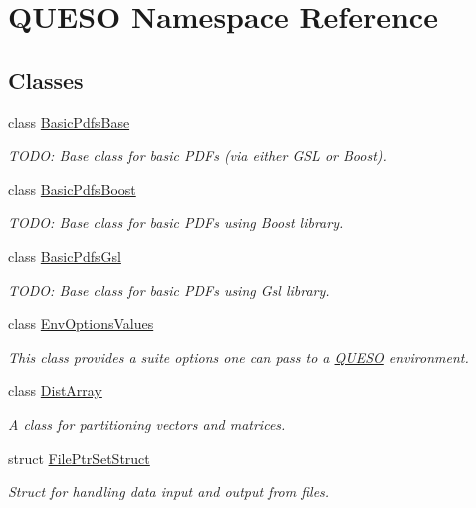\hypertarget{namespace_q_u_e_s_o}{\section{Q\-U\-E\-S\-O Namespace Reference}
\label{namespace_q_u_e_s_o}
}
\subsection*{Classes}
\begin{DoxyCompactItemize}
\item 
class \hyperlink{class_q_u_e_s_o_1_1_basic_pdfs_base}{Basic\-Pdfs\-Base}
\begin{DoxyCompactList}\small\item\em T\-O\-D\-O\-: Base class for basic P\-D\-Fs (via either G\-S\-L or Boost). \end{DoxyCompactList}\item 
class \hyperlink{class_q_u_e_s_o_1_1_basic_pdfs_boost}{Basic\-Pdfs\-Boost}
\begin{DoxyCompactList}\small\item\em T\-O\-D\-O\-: Base class for basic P\-D\-Fs using Boost library. \end{DoxyCompactList}\item 
class \hyperlink{class_q_u_e_s_o_1_1_basic_pdfs_gsl}{Basic\-Pdfs\-Gsl}
\begin{DoxyCompactList}\small\item\em T\-O\-D\-O\-: Base class for basic P\-D\-Fs using Gsl library. \end{DoxyCompactList}\item 
class \hyperlink{class_q_u_e_s_o_1_1_env_options_values}{Env\-Options\-Values}
\begin{DoxyCompactList}\small\item\em This class provides a suite options one can pass to a \hyperlink{namespace_q_u_e_s_o}{Q\-U\-E\-S\-O} environment. \end{DoxyCompactList}\item 
class \hyperlink{class_q_u_e_s_o_1_1_dist_array}{Dist\-Array}
\begin{DoxyCompactList}\small\item\em A class for partitioning vectors and matrices. \end{DoxyCompactList}\item 
struct \hyperlink{struct_q_u_e_s_o_1_1_file_ptr_set_struct}{File\-Ptr\-Set\-Struct}
\begin{DoxyCompactList}\small\item\em Struct for handling data input and output from files. \end{DoxyCompactList}\item 

\end{DoxyCompactItemize}
